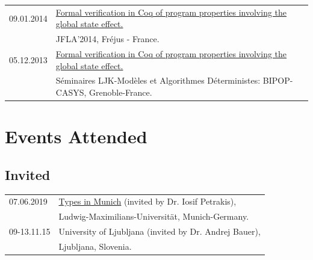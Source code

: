 \documentclass[a4paper,9pt]{article} %
\begin{document}
\begin{longtable}{ll}
{\normalsize09.01.2014} & \href{http://jfla.inria.fr/2014/ekici.pdf}{ Formal verification in Coq of program properties involving the global state effect.} \\
& JFLA'2014, Fréjus - France.\\[0.25cm]
{\normalsize05.12.2013} & \href{http://ljk.imag.fr/membres/Burak.Ekici/BurakEkici_LJK-Seminar.pdf}{Formal verification in Coq of program properties involving the global state effect.}\\
& Séminaires LJK-Modèles et Algorithmes Déterministes: BIPOP-CASYS, Grenoble-France.
\end{longtable}


\section*{Events Attended}
{\vskip4mm}
\subsection*{Invited}

\begin{tabular}{ll}	
{\small 07.06.2019} & \href{http://cj-xu.github.io/tim19/index.html}{Types in Munich} (invited by Dr. Iosif Petrakis),\\
& Ludwig-Maximilians-Universität, Munich-Germany.\\[0.25cm]
{\small09-13.11.15} & University of Ljubljana (invited by Dr. Andrej Bauer), \\
& Ljubljana, Slovenia.
\end{tabular}
\end{document}
